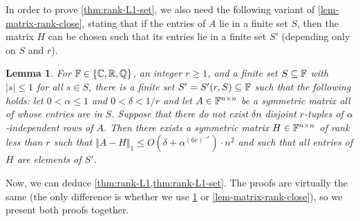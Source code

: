 \documentclass{daj}
\theoremstyle{plain}
\theoremstyle{plain}
\newtheorem{lem}[thm]{Lemma}
\theoremstyle{plain}
\theoremstyle{plain}
\theoremstyle{definition}
\theoremstyle{plain}
\theoremstyle{plain}
\theoremstyle{definition}
\theoremstyle{definition}
\theoremstyle{plain}
\begin{document}
In order to prove \cref{thm:rank-L1-set}, we also need the following variant of \cref{lem-matrix-rank-close}, stating that if the entries of $A$ lie in a finite set $S$, then the matrix $H$ can be chosen such that its entries lie in a finite set $S'$ (depending only on $S$ and $r$).

\begin{lem}\label{lem-matrix-rank-close-set}
For $\mathbb{F}\in \lbrace \mathbb{C},\mathbb{R}, \mathbb{Q}\rbrace$, an integer $r\geq 1$, and a finite set $S\subseteq \mathbb{F}$ with $\vert s\vert\leq 1$ for all $s\in S$, there is a finite set $S'=S'(r,S)\subseteq \mathbb{F}$ such that the following holds: let $0<\alpha\leq 1$ and $0<\delta<1/r$ and let $A\in \mathbb{F}^{n\times n}$ be a symmetric matrix all of whose entries are in $S$. Suppose that there do not exist $\delta n$ disjoint $r$-tuples of $\alpha$-independent rows of $A$. Then there exists a symmetric matrix $H\in \mathbb{F}^{n\times n}$ of rank less than $r$ such that $\Vert A-H\Vert_1\leq O(\delta+\alpha^{(6r)^{-r}})\cdot  n^2$ and such that all entries of $H$ are elements of $S'$.
\end{lem}

Now, we can deduce \cref{thm:rank-L1,thm:rank-L1-set}. The proofs are virtually the same (the only difference is whether we use \cref{lem-matrix-rank-close-set} or \cref{lem-matrix-rank-close}), so we present both proofs together.
\end{document}
